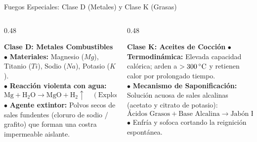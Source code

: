\begin{frame}{Fuegos Especiales: Clase D (Metales) y Clase K (Grasas)}
  \begin{columns}[T]
    \begin{column}{0.48\textwidth}
      \begin{block}{\textbf{Clase D: Metales Combustibles}}
        \scriptsize
        $\bullet$ \textbf{Materiales:} Magnesio ($Mg$), Titanio ($Ti$), Sodio ($Na$), Potasio ($K$).\\
        $\bullet$ \textbf{Reacción violenta con agua:}
        \begin{equation*}
          \mathrm{Mg + H_2O \rightarrow MgO + H_2 \uparrow \quad (\text{Explosión})}
        \end{equation*}
        $\bullet$ \textbf{Agente extintor:} Polvos secos de sales fundentes (cloruro de sodio / grafito) que forman una costra impermeable aislante.
      \end{block}
    \end{column}

    \begin{column}{0.48\textwidth}
      \begin{block}{\textbf{Clase K: Aceites de Cocción}}
        \scriptsize
        $\bullet$ \textbf{Termodinámica:} Elevada capacidad calórica; arden a $>300\,^\circ\mathrm{C}$ y retienen calor por prolongado tiempo.\\
        $\bullet$ \textbf{Mecanismo de Saponificación:} Solución acuosa de sales alcalinas (acetato y citrato de potasio):
        \begin{equation*}
          \text{Ácidos Grasos} + \text{Base Alcalina} \rightarrow \text{Jabón Espeso}
        \end{equation*}
        $\bullet$ Enfría y sofoca cortando la reignición espontánea.
      \end{block}
    \end{column}
  \end{columns}
\end{frame}
